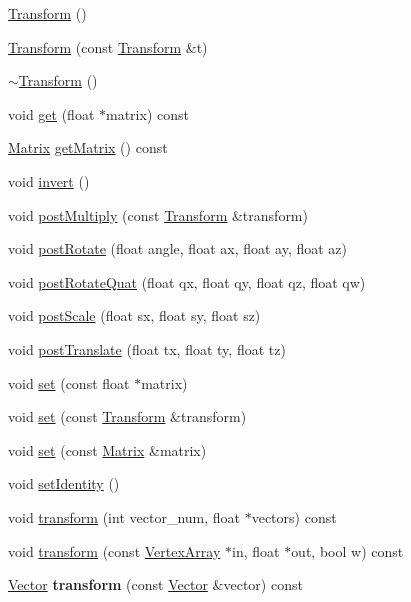 \begin{CompactItemize}
\item 
\hyperlink{classm3g_1_1Transform_9de68ec1c9b7809129814a3233ae4655}{Transform} ()
\item 
\hyperlink{classm3g_1_1Transform_6f8c18ec2bd6b5c0d7f3472752ec79d1}{Transform} (const \hyperlink{classm3g_1_1Transform}{Transform} \&t)
\item 
\hyperlink{classm3g_1_1Transform_8e627263611a76aad02c9e0b89287c68}{$\sim$Transform} ()
\item 
void \hyperlink{classm3g_1_1Transform_f78faf7dcc06f53604ad08965babb7b3}{get} (float $\ast$matrix) const 
\item 
\hyperlink{classm3g_1_1Matrix}{Matrix} \hyperlink{classm3g_1_1Transform_3ab68d9aa9eafd77e47631467de93f6f}{getMatrix} () const 
\item 
void \hyperlink{classm3g_1_1Transform_7fa1616cc61c19a5efcc863c950f7f30}{invert} ()
\item 
void \hyperlink{classm3g_1_1Transform_ad6083d90dbecc7e5bb39d5062723a0d}{postMultiply} (const \hyperlink{classm3g_1_1Transform}{Transform} \&transform)
\item 
void \hyperlink{classm3g_1_1Transform_4abf135257f132cdf9580f3a3e11ea6c}{postRotate} (float angle, float ax, float ay, float az)
\item 
void \hyperlink{classm3g_1_1Transform_7ce6ca00ac17bc4bb5f271c48da5e2dc}{postRotateQuat} (float qx, float qy, float qz, float qw)
\item 
void \hyperlink{classm3g_1_1Transform_4cbb4aa3878b658da54a144896f71446}{postScale} (float sx, float sy, float sz)
\item 
void \hyperlink{classm3g_1_1Transform_638498b811d6ccdf60b7f1f3de157ed6}{postTranslate} (float tx, float ty, float tz)
\item 
void \hyperlink{classm3g_1_1Transform_d1a2203142a848286c80d66c8c7fa37d}{set} (const float $\ast$matrix)
\item 
void \hyperlink{classm3g_1_1Transform_8926ff19517a76de8f938025e9d3163d}{set} (const \hyperlink{classm3g_1_1Transform}{Transform} \&transform)
\item 
void \hyperlink{classm3g_1_1Transform_18ea3e0bff5da78a203fa770a5cfee97}{set} (const \hyperlink{classm3g_1_1Matrix}{Matrix} \&matrix)
\item 
void \hyperlink{classm3g_1_1Transform_382e6ad7e6721b121e510959e1011be3}{setIdentity} ()
\item 
void \hyperlink{classm3g_1_1Transform_441599a6e846a344be78571668406619}{transform} (int vector\_\-num, float $\ast$vectors) const 
\item 
void \hyperlink{classm3g_1_1Transform_930167bb932a1c26c160fa1eece500d3}{transform} (const \hyperlink{classm3g_1_1VertexArray}{VertexArray} $\ast$in, float $\ast$out, bool w) const 
\item 
\hypertarget{classm3g_1_1Transform_46832c09c309a900fdab65b15bb5e8a7}{
\hyperlink{classm3g_1_1Vector}{Vector} \textbf{transform} (const \hyperlink{classm3g_1_1Vector}{Vector} \&vector) const }
\label{classm3g_1_1Transform_46832c09c309a900fdab65b15bb5e8a7}


\end{CompactItemize}
